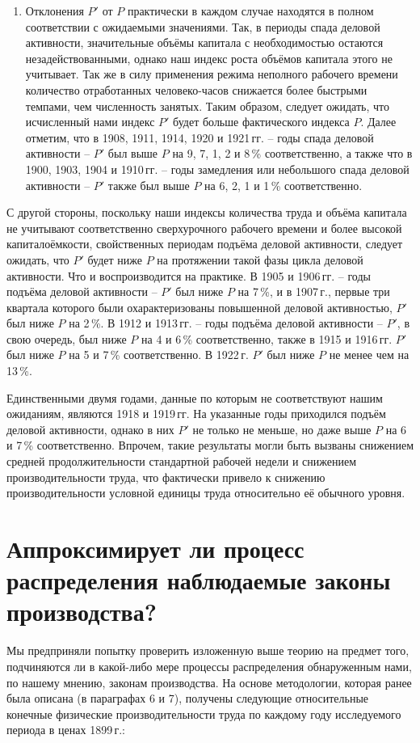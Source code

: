 \documentclass[leqno]{article}  %
\begin{document}
\begin{enumerate}[{(1)}]
\par
\item Отклонения \(P'\) от \(P\) практически в каждом случае находятся в полном соответствии с ожидаемыми значениями. Так, в периоды спада деловой активности, значительные объёмы капитала с необходимостью остаются незадействованными, однако наш индекс роста объёмов капитала этого не учитывает. Так же в силу применения режима неполного рабочего времени количество отработанных человеко-часов снижается более быстрыми темпами, чем численность занятых. Таким образом, следует ожидать, что исчисленный нами индекс \(P'\) будет больше фактического индекса \(P\). Далее отметим, что в 1908, 1911, 1914, 1920 и 1921\,гг. -- годы спада деловой активности -- \(P'\) был выше \(P\) на 9, 7, 1, 2 и 8\,\% соответственно, а также что в 1900, 1903, 1904 и 1910\,гг. -- годы замедления или небольшого спада деловой активности -- \(P'\) также был выше \(P\) на 6, 2, 1 и 1\,\% соответственно.
\end{enumerate}
С другой стороны, поскольку наши индексы количества труда и объёма капитала не учитывают соответственно сверхурочного рабочего времени и более высокой капиталоёмкости, свойственных периодам подъёма деловой активности, следует ожидать, что \(P'\) будет ниже \(P\) на протяжении такой фазы цикла деловой активности. Что и воспроизводится на практике. В 1905 и 1906\,гг. -- годы подъёма деловой активности -- \(P'\) был ниже \(P\) на 7\,\%, и в 1907\,г., первые три квартала которого были охарактеризованы повышенной деловой активностью, \(P'\) был ниже \(P\) на 2\,\%. В 1912 и 1913\,гг. -- годы подъёма деловой активности -- \(P'\), в свою очередь, был ниже \(P\) на 4 и 6\,\% соответственно, также в 1915 и 1916\,гг. \(P'\) был ниже \(P\) на 5 и 7\,\% соответственно. В 1922\,г. \(P'\) был ниже \(P\) не менее чем на 13\,\%.
\par
Единственными двумя годами, данные по которым не соответствуют нашим ожиданиям, являются 1918 и 1919\,гг. На указанные годы приходился подъём деловой активности, однако в них \(P'\)
не только не меньше, но даже выше \(P\) на 6 и 7\,\% соответственно. Впрочем, такие результаты могли быть вызваны снижением средней продолжительности стандартной рабочей недели и снижением производительности труда, что фактически привело к снижению производительности условной единицы труда относительно её обычного уровня.
\section{Аппроксимирует ли процесс распределения наблюдаемые законы производства?}
Мы предприняли попытку проверить изложенную выше теорию на предмет того, подчиняются ли в какой-либо мере процессы распределения обнаруженным нами, по нашему мнению, законам производства. На основе методологии, которая ранее была описана (в параграфах 6 и 7), получены следующие относительные конечные физические производительности труда по каждому году исследуемого периода в ценах 1899\,г.:
\par
\end{document}
